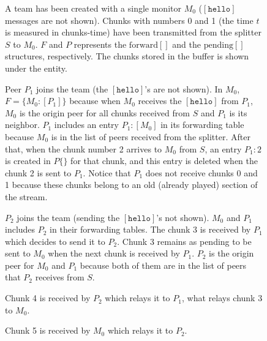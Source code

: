 \begin{center}
  \begin{figure}
     \caption{A team has been created with a
      single monitor $M_0$ ($[\mathtt{hello}]$ messages are not
      shown). Chunks with numbers 0 and 1 (the time $t$ is measured in
      chunks-time) have been transmitted from the splitter $S$ to
      $M_0$. $F$ and $P$ represents the $\text{forward}[]$ and the
      $\text{pending}[]$ structures, respectively. The chunks stored
      in the buffer is shown under the entity.\label{fig:team_0}}
  \end{figure}

  \begin{figure}
     \caption{Peer $P_1$ joins the team (the
      $[\mathtt{hello}]$'s are not shown). In $M_0$, $F=\{M_0:[P_1]\}$
      because when $M_0$ receives the $[\mathtt{hello}]$ from $P_1$,
      $M_0$ is the origin peer for all chunks received from $S$ and
      $P_1$ is its neighbor. $P_1$ includes an entry $P_1:[M_0]$ in
      its forwarding table because $M_0$ is in the list of peers
      received from the splitter. After that, when the chunk number 2
      arrives to $M_0$ from $S$, an entry $P_1:2$ is created in
      $P\{\}$ for that chunk, and this entry is deleted when the chunk
      2 is sent to $P_1$. Notice that $P_1$ does not receive chunks 0
      and 1 because these chunks belong to an old (already played)
      section of the stream.\label{fig:team_1}}
  \end{figure}

  \begin{figure}
     \caption{$P_2$ joins the team (sending the
      $[\mathtt{hello}]$'s not shown). $M_0$ and $P_1$ includes $P_2$
      in their forwarding tables. The chunk 3 is received by $P_1$
      which decides to send it to $P_2$. Chunk 3 remains as pending to
      be sent to $M_0$ when the next chunk is received by $P_1$. $P_2$
      is the origin peer for $M_0$ and $P_1$ because both of them are
      in the list of peers that $P_2$ receives from
      $S$. \label{fig:team_2}}
  \end{figure}

  \begin{figure}
     \caption{Chunk 4 is received by $P_2$
      which relays it to $P_1$, what relays chunk 3 to
      $M_0$.\label{fig:team_3}}
  \end{figure}

  \begin{figure}
     \caption{Chunk 5 is received by $M_0$
      which relays it to $P_2$.\label{fig:team_4}}
  \end{figure}


\end{center}
